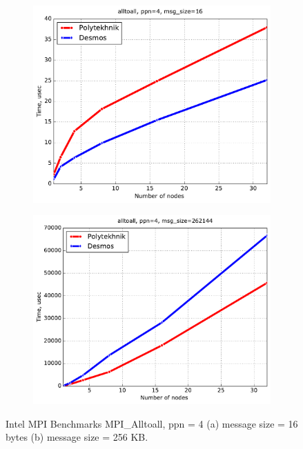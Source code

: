 \documentclass{llncs}
\begin{document}
\begin{figure}[h!]
\centering
   \begin{subfigure}{0.48\textwidth}
  \includegraphics[width=1\textwidth]{img/alltoall_ppn=4_size=16.pdf}\caption{}
  \end{subfigure}
  \begin{subfigure}{0.48\textwidth}
  \includegraphics[width=1\textwidth]{img/alltoall_ppn=4_size=262144.pdf}\caption{}
   \end{subfigure}
\caption{Intel MPI Benchmarks MPI\_Alltoall, ppn = 4 (a) message size = 16 bytes (b) message size = 256 KB. }
\end{figure}
\end{document}
